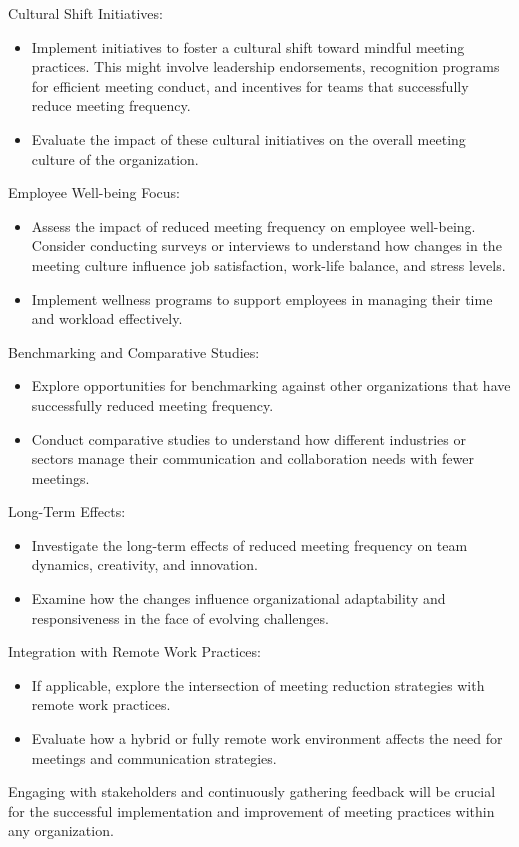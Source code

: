 \begin{enumerate}
\begin{itemize}
\end{itemize}
{\bfseries \item Cultural Shift Initiatives:}
\begin{itemize}
   \item Implement initiatives to foster a cultural shift toward mindful meeting practices. This might involve leadership endorsements, recognition programs for efficient meeting conduct, and incentives for teams that successfully reduce meeting frequency.
   \item Evaluate the impact of these cultural initiatives on the overall meeting culture of the organization.
\end{itemize}
{\bfseries \item Employee Well-being Focus:}
\begin{itemize}
   \item Assess the impact of reduced meeting frequency on employee well-being. Consider conducting surveys or interviews to understand how changes in the meeting culture influence job satisfaction, work-life balance, and stress levels.
   \item Implement wellness programs to support employees in managing their time and workload effectively.
\end{itemize}
{\bfseries \item Benchmarking and Comparative Studies:}
\begin{itemize}
   \item Explore opportunities for benchmarking against other organizations that have successfully reduced meeting frequency.
   \item Conduct comparative studies to understand how different industries or sectors manage their communication and collaboration needs with fewer meetings.
\end{itemize}
{\bfseries \item Long-Term Effects:}
\begin{itemize}
   \item Investigate the long-term effects of reduced meeting frequency on team dynamics, creativity, and innovation.
   \item Examine how the changes influence organizational adaptability and responsiveness in the face of evolving challenges.
\end{itemize}
{\bfseries \item Integration with Remote Work Practices:}
\begin{itemize}
   \item If applicable, explore the intersection of meeting reduction strategies with remote work practices.
   \item Evaluate how a hybrid or fully remote work environment affects the need for meetings and communication strategies.
\end{itemize}
\end{enumerate}
Engaging with stakeholders and continuously gathering feedback will be crucial for the successful implementation and improvement of meeting practices within any organization.


